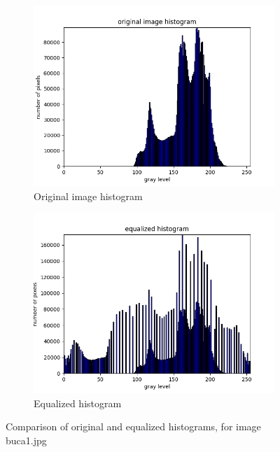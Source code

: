 \documentclass[10pt]{article}
\begin{document}
\begin{figure}[ht]
  \centering
  \begin{subfigure}[b]{0.4\textwidth}
    \includegraphics[width=\textwidth]{images/buca-h.png}
    \caption{Original image histogram}
    \label{fig:original-histogram}
  \end{subfigure}
  \begin{subfigure}[b]{0.4\textwidth}
    \includegraphics[width=\textwidth]{images/buca-e.png}
    \caption{Equalized histogram}
    \label{fig:equalized-histogram}
  \end{subfigure}
  \caption{Comparison of original and equalized histograms, for image buca1.jpg}
\end{figure}
\end{document}
